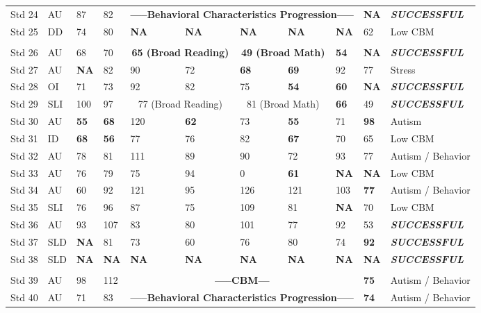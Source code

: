 \documentclass[twoside]{article}
\begin{document}
\begin{tiny}
\begin{landscape}
\begin{longtable}{p{1.5cm}p{1.5cm}p{1.5cm}p{1.5cm}p{1.75cm}p{1.75cm}p{1.75cm}p{1.75cm}p{1.75cm}p{1.75cm}p{2.5cm}@{}}
Std 24 & AU & 87 & 82 & \multicolumn{5}{c}{\textbf{-----Behavioral Characteristics Progression-----}} & \textbf{NA} &\textbf{\textit{SUCCESSFUL}}\\
Std 25 & DD & 74 & 80 & \textbf{NA} & \textbf{NA} & \textbf{NA} & \textbf{NA} & \textbf{NA} & 62 & Low CBM\\
%
\hline\\
Std 26 & AU & 68 & 70 & \multicolumn{2}{c}{\textbf{65 (Broad Reading)}} & \multicolumn{2}{c}{\textbf{49 (Broad Math)}} & \textbf{54} & \textbf{NA} & \textbf{\textit{SUCCESSFUL}}\\
Std 27 & AU & \textbf{NA} & 82 & 90 & 72 & \textbf{68} & \textbf{69} & 92 & 77 & Stress\\
Std 28 & OI & 71 & 73 & 92 & 82 & 75 & \textbf{54} & \textbf{60} & \textbf{NA} & \textbf{\textit{SUCCESSFUL}} \\
Std 29 & SLI & 100 & 97 & \multicolumn{2}{c}{77 (Broad Reading)} & \multicolumn{2}{c}{81 (Broad Math)} & \textbf{66} & 49 & \textbf{\textit{SUCCESSFUL}} \\
Std 30 & AU & \textbf{55} & \textbf{68} & 120 & \textbf{62} & 73 & \textbf{55} & 71 & \textbf{98} & Autism\\
Std 31 & ID & \textbf{68} & \textbf{56} & 77 & 76 & 82 & \textbf{67} & 70 & 65 & Low CBM \\
Std 32 & AU & 78 & 81 & 111 & 89 & 90 & 72 & 93 & 77 & Autism / Behavior \\
Std 33 & AU & 76 & 79 & 75 & 94 & 0 & \textbf{61} & \textbf{NA} & \textbf{NA} & Low CBM\\
Std 34 & AU & 60 & 92 & 121 & 95 & 126 & 121 & 103 & \textbf{77} & Autism / Behavior\\
Std 35 & SLI & 76 & 96 & 87 & 75 & 109 & 81 & \textbf{NA} & 70 & Low CBM\\
Std 36 & AU & 93 & 107 & 83 &80 & 101 & 77 & 92 & 53 & \textbf{\textit{SUCCESSFUL}}\\
Std 37 & SLD & \textbf{NA} & 81 & 73 & 60 & 76 & 80 & 74 & \textbf{92} & \textbf{\textit{SUCCESSFUL}}\\
Std 38 & SLD & \textbf{NA} & \textbf{NA} & \textbf{NA} & \textbf{NA} & \textbf{NA} & \textbf{NA} & \textbf{NA} & \textbf{NA} & \textbf{\textit{SUCCESSFUL}}\\
\hline\\
Std 39 & AU & 98 & 112 & \multicolumn{5}{c}{\textbf{-----CBM---}} & \textbf{75} & Autism / Behavior\\
Std 40 & AU & 71 & 83 & \multicolumn{5}{c}{\textbf{-----Behavioral Characteristics Progression-----}} & \textbf{74} & Autism / Behavior\\

\end{longtable}
\end{landscape}
\end{tiny}
\end{document}
